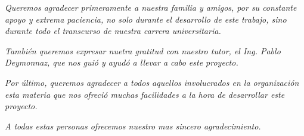 \begin{center}

\textit{
  Queremos agradecer primeramente a nuestra familia y amigos, por su constante apoyo y extrema
  paciencia, no solo durante el desarrollo de este trabajo, sino durante todo el transcurso de
  nuestra carrera universitaria.}

\textit{También queremos expresar nuetra gratitud con nuestro tutor, el Ing. Pablo Deymonnaz,
que nos guió y ayudó a llevar a cabo este proyecto.}

\textit{Por último, queremos agradecer a todos aquellos involucrados en la organización esta materia que
nos ofreció muchas facilidades a la hora de desarrollar este proyecto.}

\textit{A todas estas personas ofrecemos nuestro mas sincero agradecimiento.}
\end{center}